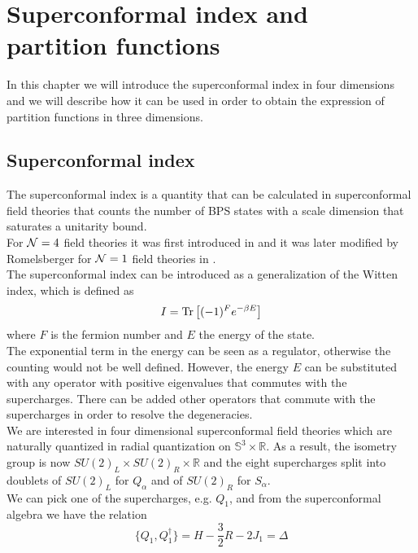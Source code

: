 

\chapter{Superconformal index and partition functions}

In this chapter we will introduce the superconformal index in four dimensions and we will describe how it can be used in order to obtain the expression of partition functions in three dimensions.\\
{\color{red}{ \LARGE Devo Aggiunger qualcosa}}


\section{Superconformal index}
The superconformal index is a quantity that can be calculated in superconformal field theories that counts the number of BPS states with a scale dimension that saturates a unitarity bound.\\
For $\mathcal{N}=4$ field theories it was first introduced in \cite{Kinney:2005ej}
and it was later modified by Romelsberger for $\mathcal{N}=1$ field theories in \cite{Romelsberger:2005eg}.\\
The superconformal index can be introduced as a generalization of the Witten index, which is defined as 
\begin{equation}
I = \mathrm{Tr } \,{ \left[   (-1)^F e^{-\beta E}\right]}
\end{equation}
where $F$ is the fermion number and $E$ the energy of the state.\\
The exponential term in the energy can be seen as a regulator, otherwise the counting would not be well defined.
However, the energy $E$ can be substituted with any operator with positive eigenvalues that commutes with the supercharges. 
There can be added other operators that commute with the supercharges in order to resolve the degeneracies.
\\
We are interested in four dimensional superconformal field theories which are naturally quantized in radial quantization on $\mathbb{S}^3 \times \mathbb{R}$. 
As a result, the isometry group is now $SU(2)_L \times SU(2)_R \times \mathbb{R}$ and the eight supercharges split into doublets of $SU(2)_L$ for $Q_{\alpha}$ and of $SU(2)_R$ for $S_{\alpha}$.\\
We can pick one of the supercharges, e.g. $Q_1$, and from the superconformal algebra we have the relation
\begin{equation}
 \{Q_1, Q_1^{\dagger} \} = H - \frac{3}{2} R - 2 J_1 = \Delta
 \end{equation} 
